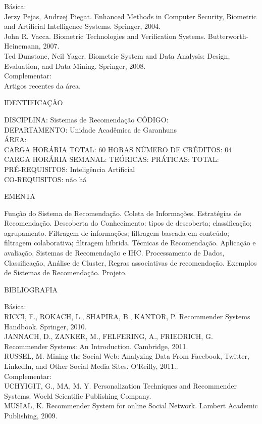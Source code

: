 \documentclass[
	12pt,				%
	openright,			%
  oneside,     %
	a4paper,			%
	english,			%
	french,				%
	spanish,			%
	brazil				%
	]{abntex2}
\begin{document}
\begin{apendicesenv}
Básica:\\
Jerzy Pejas, Andrzej Piegat. Enhanced Methods in Computer Security,
Biometric and Artificial Intelligence Systems. Springer, 2004.\\
John R. Vacca. Biometric Technologies and Verification Systems.
Butterworth-Heinemann, 2007.
\\Ted Dunstone, Neil Yager. Biometric System and Data Analysis: Design,
Evaluation, and Data Mining. Springer, 2008.\\
Complementar:\\
Artigos recentes da área.

\newpage IDENTIFICAÇÃO

DISCIPLINA: Sistemas de Recomendação CÓDIGO:\\ 
DEPARTAMENTO: Unidade Acadêmica de Garanhuns\\
ÁREA: \\
CARGA HORÁRIA TOTAL: 60 HORAS NÚMERO DE CRÉDITOS: 04\\
CARGA HORÁRIA SEMANAL: TEÓRICAS: PRÁTICAS: TOTAL: \\
PRÉ-REQUISITOS: Inteligência Artificial\\
CO-REQUISITOS: não há

EMENTA 

Função do Sistema de Recomendação. Coleta de Informações. Estratégias de
Recomendação. Descoberta do Conhecimento: tipos de descoberta;
classificação; agrupamento. Filtragem de informações; filtragem baseada
em conteúdo; filtragem colaborativa; filtragem híbrida. Técnicas de
Recomendação. Aplicação e avaliação. Sistemas de Recomendação e IHC.
Processamento de Dados, Classificação, Análise de Cluster, Regras
associativas de recomendação. Exemplos de Sistemas de Recomendação.
Projeto.

BIBLIOGRAFIA 

Básica:\\
RICCI, F., ROKACH, L., SHAPIRA, B., KANTOR, P. Recommender Systems
Handbook. Springer, 2010.\\JANNACH, D., ZANKER, M., FELFERING, A., FRIEDRICH, G. Recommender
Systems: An Introduction. Cambridge, 2011.\\RUSSEL, M. Mining the Social Web: Analyzing Data From Facebook, Twitter,
LinkedIn, and Other Social Media Sites. O'Reilly,
2011..\\
Complementar:\\
UCHYIGIT, G., MA, M. Y. Personalization Techniques and Recommender
Systems. Woeld Scientific Publishing Company.\\MUSIAL, K. Recommender System for online Social Network. Lambert
Academic Publishing, 2009.


\end{apendicesenv}
\end{document}
